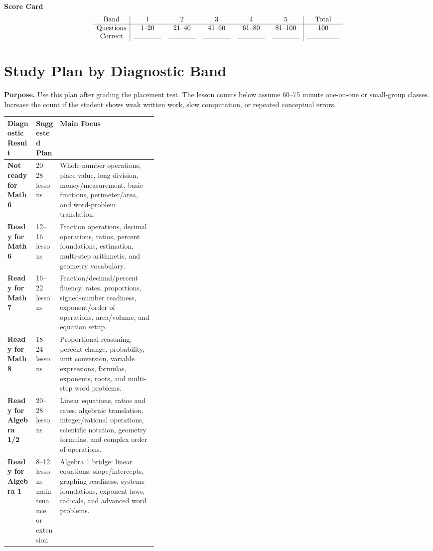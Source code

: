 \documentclass[11pt]{article}
\begin{document}
\vspace{0.6em}
\begin{guidebox}
\textbf{Score Card}
\[
\begin{array}{c|ccccc|c}
\text{Band} & 1 & 2 & 3 & 4 & 5 & \text{Total}\\ \hline
\text{Questions} & 1\text{--}20 & 21\text{--}40 & 41\text{--}60 & 61\text{--}80 & 81\text{--}100 & 100\\
\text{Correct} & \rule{0.55in}{0.4pt} & \rule{0.55in}{0.4pt} & \rule{0.55in}{0.4pt} & \rule{0.55in}{0.4pt} & \rule{0.55in}{0.4pt} & \rule{0.65in}{0.4pt}
\end{array}
\]
\end{guidebox}

\newpage
\section*{Study Plan by Diagnostic Band}

\begin{titlebox}
\textbf{Purpose.} Use this plan after grading the placement test. The lesson counts below assume 60--75 minute one-on-one or small-group classes. Increase the count if the student shows weak written work, slow computation, or repeated conceptual errors.
\end{titlebox}

\begin{center}
\begin{tabularx}{\linewidth}{>{\bfseries}p{0.19\linewidth} p{0.16\linewidth} X}
\toprule
Diagnostic Result & Suggested Plan & Main Focus\\
\midrule
Not ready for Math 6 & 20--28 lessons & Whole-number operations, place value, long division, money/measurement, basic fractions, perimeter/area, and word-problem translation.\\
\addlinespace
Ready for Math 6 & 12--16 lessons & Fraction operations, decimal operations, ratios, percent foundations, estimation, multi-step arithmetic, and geometry vocabulary.\\
\addlinespace
Ready for Math 7 & 16--22 lessons & Fraction/decimal/percent fluency, rates, proportions, signed-number readiness, exponent/order of operations, area/volume, and equation setup.\\
\addlinespace
Ready for Math 8 & 18--24 lessons & Proportional reasoning, percent change, probability, unit conversion, variable expressions, formulas, exponents, roots, and multi-step word problems.\\
\addlinespace
Ready for Algebra 1/2 & 20--28 lessons & Linear equations, ratios and rates, algebraic translation, integer/rational operations, scientific notation, geometry formulas, and complex order of operations.\\
\addlinespace
Ready for Algebra 1 & 8--12 lessons maintenance or extension & Algebra 1 bridge: linear equations, slope/intercepts, graphing readiness, systems foundations, exponent laws, radicals, and advanced word problems.\\
\bottomrule
\end{tabularx}
\end{center}
\end{document}
